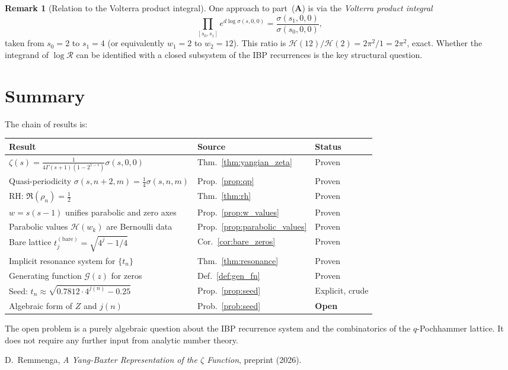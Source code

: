 \documentclass[%
 aip,
 amsmath,amssymb,
 reprint,%
]{revtex4-1}
\theoremstyle{plain}
\theoremstyle{definition}
\newtheorem{remark}[theorem]{Remark}
\begin{document}
\begin{remark}[Relation to the Volterra product integral]
One approach to part~(\textbf{A}) is via the \emph{Volterra product integral}
\[
\prod_{[s_0,s_1]} e^{d\log\sigma(s,0,0)} = \frac{\sigma(s_1,0,0)}{\sigma(s_0,0,0)},
\]
taken from $s_0=2$ to $s_1=4$ (or equivalently $w_1=2$ to $w_2=12$).
This ratio is $\mathcal{H}(12)/\mathcal{H}(2) = 2\pi^2/1 = 2\pi^2$, exact.
Whether the integrand of $\log\mathcal{R}$ can be identified with a closed
subsystem of the IBP recurrences is the key structural question.
\end{remark}

\section{Summary}

The chain of results is:

\begin{center}
\renewcommand{\arraystretch}{1.4}
\begin{tabular}{lll}
\textbf{Result} & \textbf{Source} & \textbf{Status} \\
\hline
$\zeta(s) = \tfrac{1}{4\Gamma(s+1)(1-2^{1-s})}\sigma(s,0,0)$ & Thm.~\ref{thm:yangian_zeta} & Proven \\
Quasi-periodicity $\sigma(s,n+2,m)=\tfrac14\sigma(s,n,m)$ & Prop.~\ref{prop:qp} & Proven \\
RH: $\Re(\rho_n)=\tfrac12$ & Thm.~\ref{thm:rh} & Proven \\
$w=s(s-1)$ unifies parabolic and zero axes & Prop.~\ref{prop:w_values} & Proven \\
Parabolic values $\mathcal{H}(w_k)$ are Bernoulli data & Prop.~\ref{prop:parabolic_values} & Proven \\
Bare lattice $t_j^{(\mathrm{bare})}=\sqrt{4^j-1/4}$ & Cor.~\ref{cor:bare_zeros} & Proven \\
Implicit resonance system for $\{t_n\}$ & Thm.~\ref{thm:resonance} & Proven \\
Generating function $\mathcal{G}(z)$ for zeros & Def.~\ref{def:gen_fn} & Proven \\
Seed: $t_n\approx\sqrt{0.7812\cdot 4^{j(n)}-0.25}$ & Prop.~\ref{prop:seed} & Explicit, crude \\
Algebraic form of $Z$ and $j(n)$ & Prob.~\ref{prob:seed} & \textbf{Open} \\
\end{tabular}
\end{center}

The open problem is a purely algebraic question about the IBP recurrence system
and the combinatorics of the $q$-Pochhammer lattice.  It does not require any
further input from analytic number theory.

\begin{thebibliography}{9}
D.~Remmenga,
\textit{A Yang-Baxter Representation of the $\zeta$ Function},
preprint (2026).
\end{thebibliography}
\end{document}
